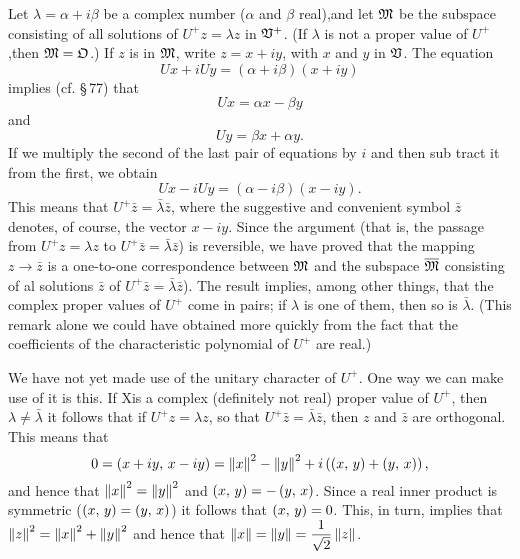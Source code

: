 Let \(\lambda = \alpha + i\beta\) be a complex number (\(\alpha\) and \(\beta\)
real),and let \(\mathfrak{M}\) be the subspace consisting of all solutions of \(U^+ z
= \lambda z\) in \(\mathfrak{V}^+\). (If \(\lambda\) is not a proper value of
\(U^+\),then \(\mathfrak{M} = \frak{O}\).) If \(z\) is in \(\mathfrak{M}\), write \(z = x +
iy\), with \(x\) and \(y\) in \(\mathfrak{V}\). The equation
\begin{equation*}
    Ux + iUy = (\alpha + i\beta)(x + iy)
\end{equation*}
implies (cf. \S\,77) that
\begin{equation*}
    Ux = \alpha x - \beta y
\end{equation*}
and
\begin{equation*}
    Uy = \beta x + \alpha y.
\end{equation*}
If we multiply the second of the last pair of equations by \(i\) and then sub tract it from the first, we obtain
\begin{equation*}
    Ux - iUy = (\alpha - i\beta)(x - iy).
\end{equation*}
This means that \(U^+ \bar{z} = \bar{\lambda} \bar{z}\), where the suggestive
and convenient symbol \(\bar{z}\) denotes, of course, the vector \(x - iy\).
Since the argument (that is, the passage from \(U^+ z = \lambda z\) to \(U^+
\bar{z} = \bar{\lambda} \bar{z}\)) is reversible, we have proved that the
mapping \(z \to \bar{z}\) is a one-to-one correspondence between \(\mathfrak{M}\) and
the subspace \(\overline{\mathfrak{M}}\) consisting of al solutions \(\bar{z}\) of
\(U^+ \bar{z} = \bar{\lambda} \bar{z}\)). The result implies, among other
things, that the complex proper values of \(U^+\) come in pairs; if \(\lambda\)
is one of them, then so is \(\bar{\lambda}\). (This remark alone we could have
obtained more quickly from the fact that the coefficients of the characteristic
polynomial of \(U^+\) are real.)

We have not yet made use of the unitary character of \(U^+\). One way we can
make use of it is this. If Xis a complex (definitely not real) proper value of
\(U^+\), then \(\lambda \neq \bar{\lambda}\) it follows that if \(U^+ z =
\lambda z\), so that \(U^+ \bar{z} = \bar{\lambda} \bar{z}\), then \(z\) and
\(\bar{z}\) are orthogonal. This means that
\begin{equation*}
    0 = \left(x+iy,\,x-iy\right) = \left\lVert x\right\rVert^2 - \left\lVert y\right\rVert^2 + i\left(\left(x,\,y\right) + \left(y,\,x\right)\right),
\end{equation*}
and hence that \(\left\lVert x\right\rVert^2 = \left\lVert y\right\rVert^2\) and \(\left(x,\,y\right) =
-\left(y,\,x\right)\). Since a real inner product is symmetric (\(\left(x,\,y\right)
= \left(y,\,x\right)\)) it follows that \(\left(x,\,y\right) = 0\). This, in
turn, implies that \(\left\lVert z\right\rVert^2 = \left\lVert x\right\rVert^2 + \left\lVert y\right\rVert^2\) and hence that
\(\displaystyle \left\lVert x\right\rVert = \left\lVert y\right\rVert = \frac{1}{\sqrt{2}}\left\lVert z\right\rVert\).

